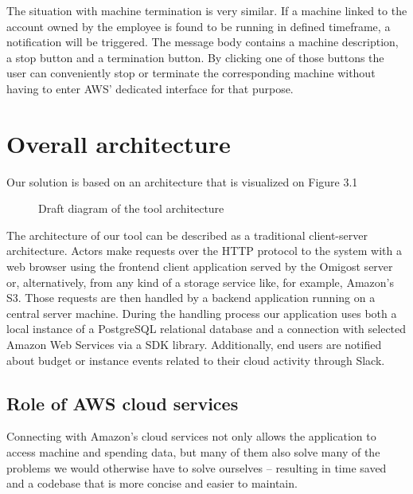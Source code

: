 \documentclass[licencjacka,en]{thesisclass}
\begin{document}
    \bigskip

    The situation with machine termination is very similar.
    If a machine linked to the account owned by the employee
    is found to be running in defined timeframe, a notification will be triggered.
    The message body contains a machine description, a stop button and a termination button.
    By clicking one of those buttons the user can conveniently
    stop or terminate the corresponding machine without having
    to enter AWS' dedicated interface for that purpose.


    \section{Overall architecture}
    Our solution is based on an architecture that is visualized on Figure 3.1

    \begin{figure}[!htb]
      \caption{\label{fig:arch-diag} Draft diagram of the tool architecture}
    \end{figure}

    The architecture of our tool can be described as a traditional client-server architecture.
    Actors make requests over the HTTP protocol to the system with a web browser
    using the frontend client application
    served by the Omigost server or, alternatively, from any kind of a storage
    service like, for example, Amazon's S3.
    Those requests are then handled by a backend application running on a central server machine.
    During the handling process our application uses both a local instance
    of a PostgreSQL relational database
    and a connection with selected Amazon Web Services via a SDK library.
    Additionally, end users are notified about budget or instance events
    related to their cloud activity through Slack.

    \subsection{Role of AWS cloud services}
    Connecting with Amazon's cloud services not only allows the application
    to access machine and spending data,
    but many of them also solve many of the problems we would otherwise have
    to solve ourselves -- resulting
    in time saved and a codebase that is more concise and easier to maintain.
\end{document}
